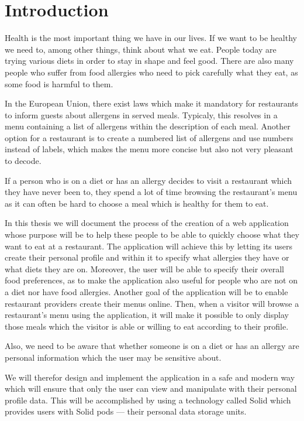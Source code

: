 \chapter*{Introduction}

Health is the most important thing we have in our lives.
If we want to be healthy we need to, among other things, think about what we eat.
People today are trying various diets in order to stay in shape and feel good.
There are also many people who suffer from food allergies who need to pick carefully what they eat, as some food is harmful to them. 

In the European Union, there exist laws which make it mandatory for restaurants to inform guests about allergens in served meals. Typicaly, this resolves in a menu containing a list of allergens within the description of each meal. Another option for a restaurant is to create a numbered list of allergens and use numbers instead of labels, which makes the menu more concise but also not very pleasant to decode.

If a person who is on a diet or has an allergy decides to visit a restaurant which they have never been to, they spend a lot of time browsing the restaurant's menu as it can often be hard to choose a meal which is healthy for them to eat.

In this thesis we will document the process of the creation of a web application whose purpose will be to help these people to be able to quickly choose what they want to eat at a restaurant. 
The application will achieve this by letting its users create their personal profile and within it to specify what allergies they have or what diets they are on. Moreover, the user will be able to specify their overall food preferences, as to make the application also useful for people who are not on a diet nor have food allergies.
Another goal of the application will be to enable restaurant providers create their menus online. 
Then, when a visitor will browse a restaurant's menu using the application, it will make it possible to only display those meals which the visitor is able or willing to eat according to their profile.

Also, we need to be aware that whether someone is on a diet or has an allergy are personal information which the user may be sensitive about.

We will therefor design and implement the application in a safe and modern way which will ensure that only the user can view and manipulate with their personal profile data. This will be accomplished by using a technology called Solid which provides users with Solid pods --- their personal data storage units.
